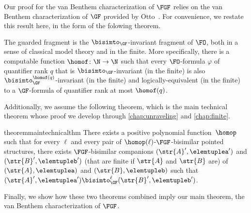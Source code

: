 \noindent
Our proof for the van Benthem characterization of $\FGF$ relies on the van Benthem characterization of $\GF$ provided by Otto~\cite{Otto2012}.
For convenience, we restate this result here, in the form of the folowing theorem.
\begin{theorem}\label{thm:vanBenthem-for-GF}
  The guarded fragment is the $\bisimto_{\GF}$-invariant fragment of $\FO$, both in a sense of classical model theory and in the finite.
  More specifically, there is a computable function $\homof \colon \N \to \N$ such that every $\FO$-formula $\varphi$ of quantifier rank $q$ that is $\bisimto_{\GF}$-invariant (in the finite) is also $\bisimto^{\homof(q)}_{\GF}$-invariant (in the finite) and logically-equivalent (in the finite) to a $\GF$-formula of quantifier rank at most $\homof(q)$.
\end{theorem}
Additionally, we assume the following theorem, which is the main technical theorem whose proof we develop through \cref{chap:unraveling} and \cref{chap:finite}.
\begin{restatable*}{theorem}{maintechnicalthm}\label{thm:main-technical-thm}
  There exists a positive polynomial function~$\homop$ such that for every $\ell$ and every pair of $\homop(\ell)$-$\FGF$-bisimilar pointed structures, there exists $\FGF$-bisimilar companions $(\str{A}', \elemtuplea')$ and $(\str{B}', \elemtupleb')$ (that are finite if $\str{A}$ and $\str{B}$ are) of $(\str{A}, \elemtuplea)$ and $(\str{B}, \elemtupleb)$ such that $(\str{A}', \elemtuplea') \bisimto^{\ell}_{\GF} (\str{B}', \elemtupleb')$.
\end{restatable*}

\noindent
Finally, we show how these two theorems combined imply our main theorem, the van Benthem characterization of $\FGF$.

